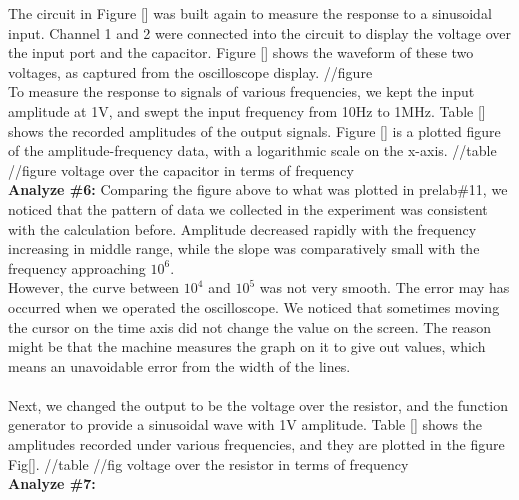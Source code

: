 \hfill\newline
\phantom{ } The circuit in Figure [] was built again to measure the response to a sinusoidal input. Channel 1 and 2 were connected into the circuit to display the voltage over the input port and the capacitor. Figure [] shows the waveform of these two voltages, as captured from the oscilloscope display. \newline
//figure\\
\phantom{ } To measure the response to signals of various frequencies, we kept the input amplitude at 1V, and swept the input frequency from 10Hz to 1MHz. Table [] shows the recorded amplitudes of the output signals. Figure [] is a plotted figure of the amplitude-frequency data, with a logarithmic scale on the x-axis.\newline
//table\newline
//figure voltage over the capacitor in terms of frequency\\

\textbf{Analyze \#6:} \newline
\phantom{ } Comparing the figure above to what was plotted in prelab\#11, we noticed that the pattern of data we collected in the experiment was consistent with the calculation before. Amplitude decreased rapidly with the frequency increasing in middle range, while the slope was comparatively small with the frequency approaching $10^6$.\\
\phantom{ } However, the curve between $10^4$ and $10^5$ was not very smooth. The error may has occurred when we operated the oscilloscope. We noticed that sometimes moving the cursor on the time axis did not change the value on the screen. The reason might be that the machine measures the graph on it to give out values, which means an unavoidable error from the width of the lines.\\\\
\phantom{ } Next, we changed the output to be the voltage over the resistor, and the function generator to provide a sinusoidal wave with 1V amplitude. Table [] shows the amplitudes recorded under various frequencies, and they are plotted in the figure Fig[].\newline
//table\newline
//fig voltage over the resistor in terms of frequency\\

\textbf{Analyze \#7:} \newline

